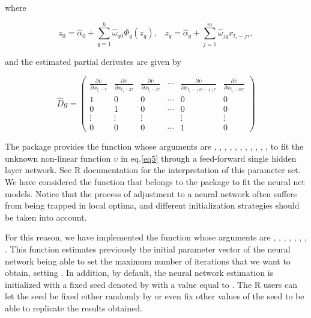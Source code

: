 \noindent where 

\begin{equation*}
{z_0} = {{\hat \alpha }_0} + \sum\limits_{q = 1}^h {{{\hat \omega }_{q0}}{\Phi _q}\left( {{z_q}} \right)}\textrm{,} \quad {z_q} = {{\hat \alpha }_q} + \sum\limits_{j = 1}^m {{{\hat \omega }_{jq}}{x_{{t_i} - j\tau }}},
\end{equation*}

\noindent and the estimated partial derivates are given by

\begin{equation}
\hat Dg = \left( {\begin{array}{*{20}{c}}
  {\frac{{\partial \hat \upsilon }}{{\partial {x_{{t_i} - \tau }}}}}&{\frac{{\partial \hat \upsilon }}{{\partial {x_{{t_i} - 2\tau }}}}}&{\frac{{\partial \hat \upsilon }}{{\partial {x_{{t_i} - 3\tau }}}}}& \cdots &{\frac{{\partial \hat \upsilon }}{{\partial {x_{{t_i} - \left( {m - 1} \right)\tau }}}}}&{\frac{{\partial \hat \upsilon }}{{\partial {x_{{t_i} - m\tau }}}}} \\ 
  1&0&0& \cdots &0&0 \\ 
  0&1&0& \cdots &0&0 \\ 
   \vdots & \vdots & \vdots &{}& \vdots & \vdots  \\ 
  0&0&0& \cdots &1&0 
\end{array}} \right)
\label{eq:28}
\end{equation}

The  package provides the function  whose arguments are , , , , , , , , , , , to fit the unknown non-linear function $\upsilon$ in eq.\ref{eq5} through a feed-forward single hidden layer network. See R documentation for the interpretation of this parameter set. We have considered the  function that belongs to the  package to fit the neural net models. Notice that the process of adjustment to a neural network often suffers from being trapped in local optima, and different initialization strategies should be taken into account. 

\newpage
For this reason, we have implemented the function  whose arguments are , , , , , , , . This function estimates previously the initial parameter vector of the neural network being able to set the maximum number of iterations that we want to obtain, setting . In addition, by default, the neural network estimation is initialized with a fixed seed denoted by  with a value equal to . The R users can let the seed be fixed either randomly by  or even fix other values of the seed to be able to replicate the results obtained. 

